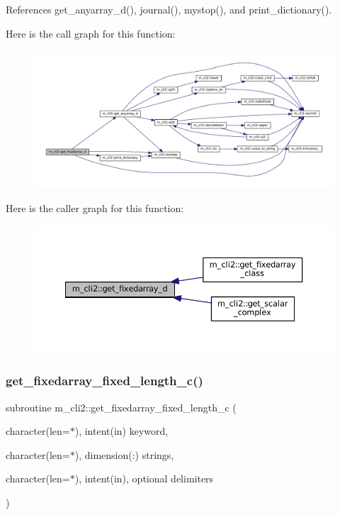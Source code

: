 References get\+\_\+anyarray\+\_\+d(), journal(), mystop(), and print\+\_\+dictionary().

Here is the call graph for this function\+:
\nopagebreak
\begin{figure}[H]
\begin{center}
\leavevmode
\includegraphics[width=350pt]{namespacem__cli2_a2c8db0f383888cb2b3ce8643de3fae93_cgraph}
\end{center}
\end{figure}
Here is the caller graph for this function\+:\nopagebreak
\begin{figure}[H]
\begin{center}
\leavevmode
\includegraphics[width=350pt]{namespacem__cli2_a2c8db0f383888cb2b3ce8643de3fae93_icgraph}
\end{center}
\end{figure}
\mbox{\label{namespacem__cli2_a8000c5e05f6c84ba17350d4a00850a6a}} 
\subsubsection{\texorpdfstring{get\+\_\+fixedarray\+\_\+fixed\+\_\+length\+\_\+c()}{get\_fixedarray\_fixed\_length\_c()}}
{\footnotesize\ttfamily subroutine m\+\_\+cli2\+::get\+\_\+fixedarray\+\_\+fixed\+\_\+length\+\_\+c (\begin{DoxyParamCaption}\item[{character(len=$\ast$), intent(in)}]{keyword,  }\item[{character(len=$\ast$), dimension(\+:)}]{strings,  }\item[{character(len=$\ast$), intent(in), optional}]{delimiters }\end{DoxyParamCaption})\hspace{0.3cm}{\ttfamily [private]}}



